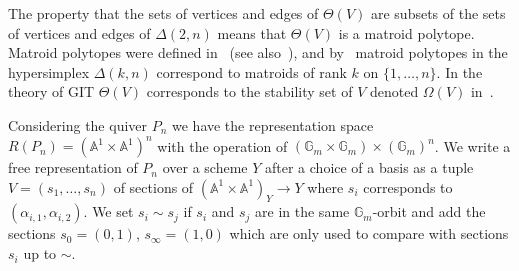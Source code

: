 \documentclass[ALCO,ThmDefs,Unicode,epreuves]{cedram}
\def\A{\mathds A}
\def\G{\mathds G}
\begin{document}
The property that the sets of vertices and edges of $\Theta(V)$
are subsets of the sets of vertices and edges of $\Delta(2,n)$ means
that $\Theta(V)$ is a matroid polytope.
Matroid polytopes were defined in~\cite{GGMS87} (see also~\cite[(1.2.6)]{Ka93a}), 
and by~\cite[Thm.~4.1]{GGMS87} matroid polytopes in the hypersimplex $\Delta(k,n)$
correspond to matroids of rank $k$ on $\{1,\ldots,n\}$.
In the theory of GIT $\Theta(V)$ corresponds to the stability set of $V$ 
denoted $\Omega(V)$ in~\cite{Re00}.


Considering the quiver $P_n$ we have the representation space $R(P_n)=(\A^1\times\A^1)^n$ 
with the operation of $(\G_m\times\G_m)\times(\G_m)^n$. We write a free representation 
of $P_n$ over a scheme $Y$ after a choice of a basis as a tuple $V=(s_1,\ldots,s_n)$ 
of sections of $(\A^1\times\A^1)_Y\to Y$ where $s_i$ corresponds to 
$(\alpha_{i,1},\alpha_{i,2})$.
We set $s_i\sim s_j$ if $s_i$ and $s_j$ are in the same $\G_m$-orbit and add 
the sections $s_0=(0,1)$, $s_\infty=(1,0)$ which are only used to compare with 
sections $s_i$ up to $\sim$.
\end{document}
